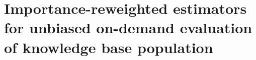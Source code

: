 \chapter[Importance-reweighted estimation]{\label{chap:kbpo} Importance-reweighted estimators for unbiased on-demand evaluation of knowledge base population}














%
%

%
%
